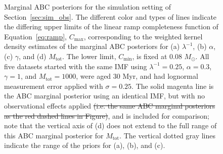 \documentclass[ejs]{imsart}
\numberwithin{equation}{section}
\theoremstyle{plain}
\newcommand{\remove}[1]{\st{#1}}
\newcommand{\Msun}{M_{\odot}}
\newcommand{\Cmin}{C_{\text{min}}}
\newcommand{\Cmax}{C_{\text{max}}}
\newcommand{\Mtot}{M_{\text{tot}}}
\begin{document}
\begin{figure}[htbp]
\begin{subfigure}{0.48\textwidth}
\end{subfigure}
%
 \caption{Marginal ABC posteriors for the simulation setting of Section~\ref{sec:sim_obs}.  The different color and types of lines indicate the differing upper limits of the linear ramp completeness function of Equation~\eqref{eq:ramp}, $\Cmax$, corresponding to the weighted kernel density estimates of the marginal ABC posteriors for (a) $\lambda^{-1}$, (b) $\alpha$, (c) $\gamma$, and (d) $\Mtot$.  
The lower limit, $\Cmin$, is fixed at 0.08 $\Msun$.  
All five datasets started with the same IMF using $\lambda^{-1} = 0.25$, $\alpha = 0.3$, $\gamma = 1$, and $\Mtot = 1000$, were aged 30 Myr, and had lognormal measurement error applied with $\sigma = 0.25$.
The solid magenta line is the ABC marginal posterior using an identical IMF, but with no observational effects applied \remove{(i.e. the same ABC marginal posteriors as the red dashed lines in Figure)}, and is included for comparison; note that the vertical axis of (d) does not extend to the full range of this ABC marginal posterior for $\Mtot$.
The vertical dotted gray lines indicate the range of the priors for (a), (b), and (c).
   }
   \label{fig:abc_pa_posterior_obs}
\end{figure}
\end{document}
